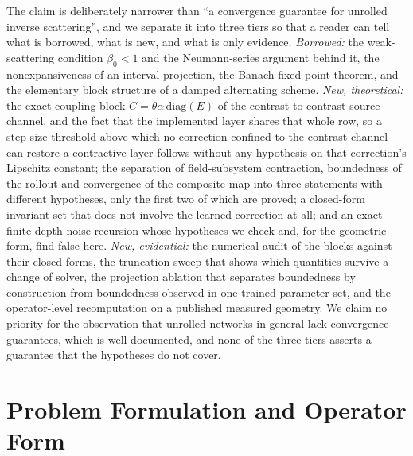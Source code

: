 \documentclass[journal,cmes,article,submit,moreauthors,pdftex]{Definitions/tsp}
\begin{document}
The claim is deliberately narrower than ``a convergence guarantee for unrolled inverse
scattering'', and we separate it into three tiers so that a reader can tell what is borrowed,
what is new, and what is only evidence.
\emph{Borrowed:} the weak-scattering condition $\beta_0<1$ and the Neumann-series argument behind
it, the nonexpansiveness of an interval projection, the Banach fixed-point theorem, and the
elementary block structure of a damped alternating scheme.
\emph{New, theoretical:} the exact coupling block $C=\theta\alpha\,\mathrm{diag}(E)$ of the
contrast-to-contrast-source channel, and the fact that the implemented layer shares that whole row,
so a step-size threshold above which no correction confined to the contrast channel can restore a
contractive layer follows without any hypothesis on that correction's Lipschitz constant; the
separation of field-subsystem contraction, boundedness of the rollout and convergence of the
composite map into three statements with different hypotheses, only the first two of which are
proved; a closed-form invariant set that does not involve the learned correction at all; and an
exact finite-depth noise recursion whose hypotheses we check and, for the geometric form, find
false here.
\emph{New, evidential:} the numerical audit of the blocks against their closed forms, the
truncation sweep that shows which quantities survive a change of solver, the projection ablation
that separates boundedness by construction from boundedness observed in one trained parameter
set, and the operator-level recomputation on a published measured geometry.
We claim no priority for the observation that unrolled networks in general lack convergence
guarantees, which is well documented, and none of the three tiers asserts a guarantee that the
hypotheses do not cover.

\section{Problem Formulation and Operator Form}\label{sec:form}
\end{document}

